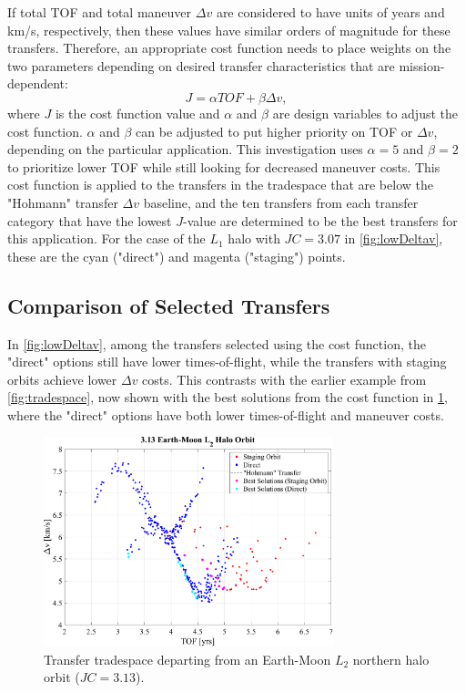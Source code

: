 If total TOF and total maneuver $\Delta v$ are considered to have units of years and km/s,
respectively, then these values have similar orders of magnitude for these transfers. Therefore, an
appropriate cost function needs to place weights on the two parameters depending on desired
transfer characteristics that are mission-dependent:
\begin{equation}
    J=\alpha TOF+\beta\Delta v,
    \label{eq:costfunction}
\end{equation}
where $J$ is the cost function value and $\alpha$ and $\beta$ are design variables to adjust the
cost function. $\alpha$ and $\beta$ can be adjusted to put higher priority on TOF or $\Delta v$,
depending on the particular application. This investigation uses $\alpha=5$ and $\beta=2$ to
prioritize lower TOF while still looking for decreased maneuver costs. This cost function is
applied to the transfers in the tradespace that are below the "Hohmann" transfer $\Delta v$
baseline, and the ten transfers from each transfer category that have the lowest $J$-value are
determined to be the best transfers for this application. For the case of the $L_{1}$ halo with
$JC=3.07$ in \cref{fig:lowDeltav}, these are the cyan ("direct") and magenta ("staging") points.

\subsection{Comparison of Selected Transfers}
In \cref{fig:lowDeltav}, among the transfers selected using the cost function, the "direct" options
still have lower times-of-flight, while the transfers with staging orbits achieve lower $\Delta v$
costs. This contrasts with the earlier example from \cref{fig:tradespace}, now shown with the best
solutions from the cost function in \cref{fig:lowBoth}, where the "direct" options have both lower
times-of-flight and maneuver costs. 

\begin{figure}[ht]
    \centering
    \includegraphics[width=0.75\textwidth]{figures/TradeSpace_L2Halo_3_13.pdf}
    \caption{Transfer tradespace departing from an Earth-Moon $L_{2}$ northern halo orbit ($JC=3.13$).}
    \label{fig:lowBoth}
\end{figure}
